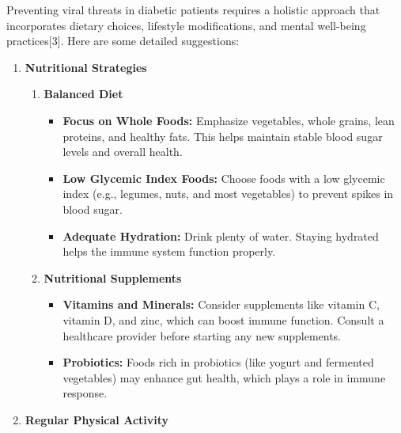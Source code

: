 \documentclass[12pt,a4paper]{article}
\begin{document}
\hspace{1em}Preventing viral threats in diabetic patients requires a holistic approach that incorporates dietary choices, lifestyle modifications, and mental well-being practices[3]. Here are some detailed suggestions:

\begin{enumerate}
    \item \textbf{Nutritional Strategies}

    \begin{enumerate}
        \item \textbf{Balanced Diet}

        \begin{itemize}
            \item \textbf{Focus on Whole Foods:} Emphasize vegetables, whole grains, lean proteins, and healthy fats. This helps maintain stable blood sugar levels and overall health.

            \item \textbf{Low Glycemic Index Foods: } Choose foods with a low glycemic index (e.g., legumes, nuts, and most vegetables) to prevent spikes in blood sugar.

            \item \textbf{Adequate Hydration:} Drink plenty of water. Staying hydrated helps the immune system function properly.
            
        \end{itemize}

        \item \textbf{Nutritional Supplements}

        \begin{itemize}
            \item \textbf{Vitamins and Minerals: }Consider supplements like vitamin C, vitamin D, and zinc, which can boost immune function. Consult a healthcare provider before starting any new supplements.


            \item \textbf{Probiotics:} Foods rich in probiotics (like yogurt and fermented vegetables) may enhance gut health, which plays a role in immune response.
            
        \end{itemize}
        
    \end{enumerate}

    \item \textbf{Regular Physical Activity}


\end{enumerate}
\end{document}
